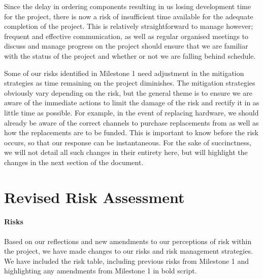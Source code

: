 Since the delay in ordering components resulting in us losing development time for the project, there is now a risk of insufficient time available for the adequate completion of the project. This is relatively straightforward to manage however; frequent and effective communication, as well as regular organised meetings to discuss and manage progress on the project should ensure that we are familiar with the status of the project and whether or not we are falling behind schedule. 

Some of our risks identified in Milestone 1 need adjustment in the mitigation strategies as time remaining on the project diminishes. The mitigation strategies obviously vary depending on the risk, but the general theme is to ensure we are aware of the immediate actions to limit the damage of the risk and rectify it in as little time as possible. For example, in the event of replacing hardware, we should already be aware of the correct channels to purchase replacements from as well as how the replacements are to be funded. This is important to know before the risk occurs, so that our response can be instantaneous. For the sake of succinctness, we will not detail all such changes in their entirety here, but will highlight the changes in the next section of the document. 

\section{Revised Risk Assessment}

\paragraph{Risks}

Based on our reflections and new amendments to our perceptions of risk within the project, we have made changes to our risks and risk management strategies. We have included the risk table, including previous risks from Milestone 1 \cite{coaker} and highlighting any amendments from Milestone 1 in bold script.


